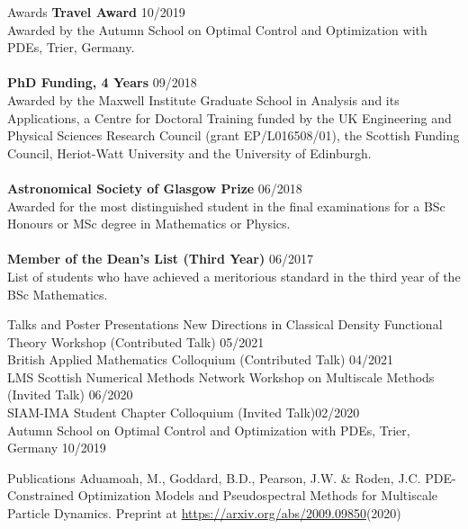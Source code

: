 \documentclass{resume} %
\begin{document}
\begin{rSection}{Awards}
	{\bf Travel Award}   \hfill{10/2019}	\\
	Awarded by the Autumn School on Optimal Control and Optimization with PDEs, Trier, Germany. \\
	\\
	{\bf PhD Funding, 4 Years} \hfill{09/2018}\\	
	Awarded by the Maxwell Institute Graduate School in Analysis and its Applications, a Centre for Doctoral Training funded by the UK Engineering and Physical Sciences Research Council (grant EP/L016508/01), the Scottish Funding Council, Heriot-Watt University and the University of Edinburgh.\\
	\\
	{\bf Astronomical Society of Glasgow Prize} \hfill{06/2018}\\ 
	Awarded for the most distinguished student in the final examinations for a BSc Honours or MSc degree in Mathematics or Physics.\\
	\\
	{\bf Member of the Dean’s List (Third Year)} \hfill{06/2017}\\
	List of students who have achieved a meritorious standard in the third year of the BSc Mathematics.
	
\end{rSection}



\begin{rSection}{Talks and Poster Presentations}
	New Directions in Classical Density Functional Theory Workshop (Contributed Talk) \hfill{05/2021}\\
	British Applied Mathematics Colloquium (Contributed Talk) \hfill{04/2021}\\
	LMS Scottish Numerical Methods Network Workshop on Multiscale Methods (Invited Talk)  \hfill{06/2020}\\
	SIAM-IMA Student Chapter Colloquium (Invited Talk)\hfill{02/2020}\\
	Autumn School on Optimal Control and Optimization with PDEs, Trier, Germany \hfill{10/2019}
	
	
\end{rSection}
\begin{rSection}{Publications}
	Aduamoah, M., Goddard, B.D., Pearson, J.W. \& Roden, J.C. PDE-Constrained Optimization Models and Pseudospectral Methods for Multiscale Particle Dynamics. Preprint at \url{https://arxiv.org/abs/2009.09850}(2020)
\end{rSection}	
	
\end{document}
